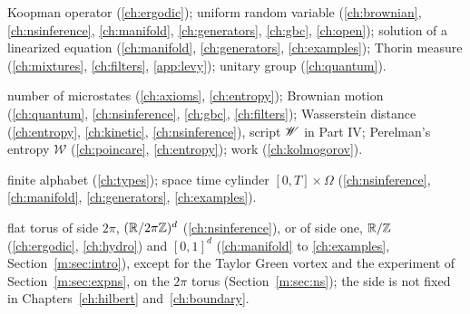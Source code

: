 \begin{description}[leftmargin=2.2em,labelwidth=1.8em,labelsep=0.4em,itemsep=0pt,parsep=0pt]
\item[$U$] Koopman operator (\ref{ch:ergodic}); uniform random variable (\ref{ch:brownian}, \ref{ch:nsinference}, \ref{ch:manifold}, \ref{ch:generators}, \ref{ch:gbc}, \ref{ch:open}); solution of a linearized equation (\ref{ch:manifold}, \ref{ch:generators}, \ref{ch:examples}); Thorin measure (\ref{ch:mixtures}, \ref{ch:filters}, \ref{app:levy}); unitary group (\ref{ch:quantum}).
\item[$W$] number of microstates (\ref{ch:axioms}, \ref{ch:entropy}); Brownian motion (\ref{ch:quantum}, \ref{ch:nsinference}, \ref{ch:gbc}, \ref{ch:filters}); Wasserstein distance (\ref{ch:entropy}, \ref{ch:kinetic}, \ref{ch:nsinference}), script $\mathscr{W}$ in Part IV; Perelman's entropy $\mathcal W$ (\ref{ch:poincare}, \ref{ch:entropy}); work (\ref{ch:kolmogorov}).
\item[$\mathcal X$] finite alphabet (\ref{ch:types}); space time cylinder $[0,T]\times\Omega$ (\ref{ch:nsinference}, \ref{ch:manifold}, \ref{ch:generators}, \ref{ch:examples}).
\item[$\T^d$] flat torus of side $2\pi$, $(\mathbb{R}/2\pi\mathbb{Z})^d$ (\ref{ch:nsinference}), or of side one, $\mathbb{R}/\mathbb{Z}$ (\ref{ch:ergodic}, \ref{ch:hydro}) and $[0,1]^d$ (\ref{ch:manifold} to \ref{ch:examples}, Section~\ref{m:sec:intro}), except for the Taylor Green vortex and the experiment of Section~\ref{m:sec:expns}, on the $2\pi$ torus (Section~\ref{m:sec:ns}); the side is not fixed in Chapters~\ref{ch:hilbert} and~\ref{ch:boundary}.
\end{description}
